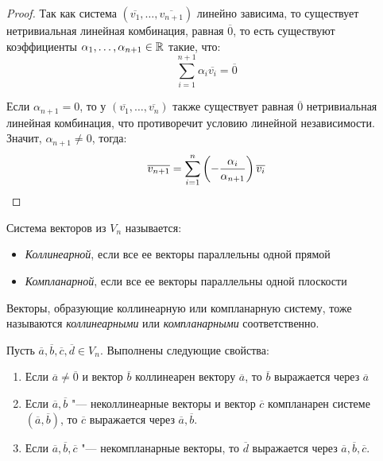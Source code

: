 \begin{proof}
	Так как система $(\overline{v_1}, \dots, \overline{v_{n + 1}})$ линейно зависима, то существует нетривиальная линейная комбинация, равная $\overline{0}$, то есть существуют коэффициенты $\alpha_1, \dotsc, \alpha_{n+1} \in \mathbb{R}$ такие, что:
	\[\sum_{i = 1}^{n+1}\alpha_i\overline{v_i} = \overline{0}\]
	
	Если $\alpha_{n + 1} = 0$, то у $(\overline{v_1}, \dots, \overline{v_n})$ также существует равная $\overline{0}$ нетривиальная линейная комбинация, что противоречит условию линейной независимости. Значит, $\alpha_{n + 1} \ne 0$, тогда:
	\[\overline{v_{n + 1}} = \sum_{i = 1}^{n}\left(-\frac{\alpha_i}{\alpha_{n + 1}}\right)\overline{v_i}\qedhere\]
\end{proof}

\begin{definition}
	Система векторов из $V_n$ называется:
	\begin{itemize}
		\item \textit{Коллинеарной}, если все ее векторы параллельны одной прямой
		\item \textit{Компланарной}, если все ее векторы параллельны одной плоскости
	\end{itemize}
	
	Векторы, образующие коллинеарную или компланарную систему, тоже называются \textit{коллинеарными} или \textit{компланарными} соответственно.
\end{definition}

\begin{proposition}
	Пусть $\overline{a}, \overline{b}, \overline{c}, \overline{d} \in V_n$. Выполнены следующие свойства:
	\begin{enumerate}
		\item Если $\overline{a} \ne \overline{0}$ и вектор $\overline{b}$ коллинеарен вектору $\overline{a}$, то $\overline{b}$ выражается через $\overline{a}$
		\item Если $\overline{a}, \overline{b}$ "--- неколлинеарные векторы и вектор $\overline{c}$ компланарен системе $(\overline{a}, \overline{b})$, то $\overline{c}$ выражается через $\overline{a}, \overline{b}$.
		\item Если $\overline{a}, \overline{b}, \overline{c}$ "--- некомпланарные векторы, то $\overline{d}$ выражается через $\overline{a}, \overline{b}, \overline{c}$.
	\end{enumerate}
\end{proposition}

